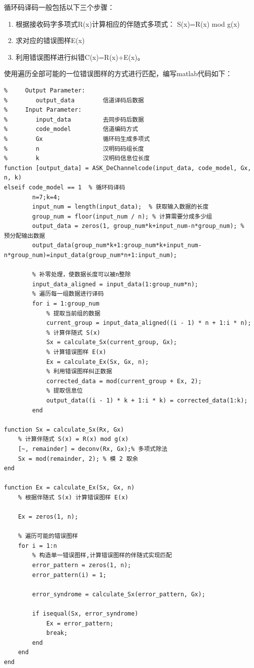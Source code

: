 \documentclass[UTF8]{ctexart}
\begin{document}
循环码译码一般包括以下三个步骤：

\begin{enumerate}
    \item 根据接收码字多项式R(x)计算相应的伴随式多项式： S(x)=R(x) \quad mod \quad g(x) 
    \item 求对应的错误图样E(x)
    \item 利用错误图样进行纠错C(x)=R(x)+E(x)。
\end{enumerate}

使用遍历全部可能的一位错误图样的方式进行匹配，编写matlab代码如下：

\begin{lstlisting}[title=ASK\_DeChannelcode.m(循环码部分), frame=shadowbox]
%  Parameter List:
%     Output Parameter:
%        output_data        信道译码后数据
%     Input Parameter:
%        input_data         去同步码后数据
%        code_model         信道编码方式
%        Gx                 循环码生成多项式
%        n                  汉明码码组长度
%        k                  汉明码信息位长度
function [output_data] = ASK_DeChannelcode(input_data, code_model, Gx, n, k)
elseif code_model == 1  % 循环码译码
        n=7;k=4;
        input_num = length(input_data);  % 获取输入数据的长度
        group_num = floor(input_num / n); % 计算需要分成多少组
        output_data = zeros(1, group_num*k+input_num-n*group_num); % 预分配输出数据
        output_data(group_num*k+1:group_num*k+input_num-n*group_num)=input_data(group_num*n+1:input_num);
    
        % 补零处理，使数据长度可以被n整除
        input_data_aligned = input_data(1:group_num*n);
        % 遍历每一组数据进行译码
        for i = 1:group_num
            % 提取当前组的数据
            current_group = input_data_aligned((i - 1) * n + 1:i * n);
            % 计算伴随式 S(x)
            Sx = calculate_Sx(current_group, Gx);
            % 计算错误图样 E(x)
            Ex = calculate_Ex(Sx, Gx, n);
            % 利用错误图样纠正数据
            corrected_data = mod(current_group + Ex, 2);
            % 提取信息位
            output_data((i - 1) * k + 1:i * k) = corrected_data(1:k);
        end

function Sx = calculate_Sx(Rx, Gx)
    % 计算伴随式 S(x) = R(x) mod g(x)
    [~, remainder] = deconv(Rx, Gx);% 多项式除法
    Sx = mod(remainder, 2); % 模 2 取余
end

function Ex = calculate_Ex(Sx, Gx, n)
    % 根据伴随式 S(x) 计算错误图样 E(x)
    
    Ex = zeros(1, n);

    % 遍历可能的错误图样
    for i = 1:n
        % 构造单一错误图样,计算错误图样的伴随式实现匹配
        error_pattern = zeros(1, n);
        error_pattern(i) = 1;

        error_syndrome = calculate_Sx(error_pattern, Gx);

        if isequal(Sx, error_syndrome)
            Ex = error_pattern;
            break;
        end
    end
end
\end{lstlisting}
\end{document}
